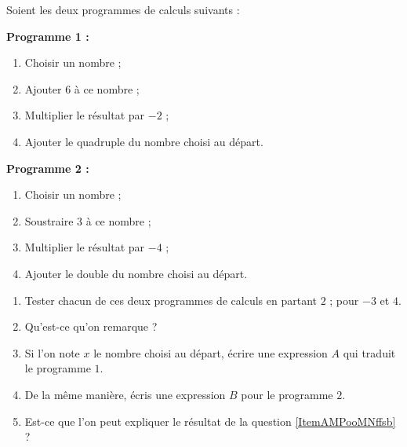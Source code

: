
\begin{exercice}\label{exosmath-0807}

Soient les deux programmes de calculs suivants :

\begin{framed}
    {\bf Programme 1 :}
\begin{enumerate}
    \item
 Choisir un nombre ;
\item
 Ajouter $6$ à ce nombre ;
\item
 Multiplier le résultat par $-2$ ;
\item
 Ajouter le quadruple du nombre choisi au départ.
\end{enumerate}
\end{framed}
\begin{framed}
    {\bf Programme 2 :}
\begin{enumerate}
    \item
 Choisir un nombre ;
    \item
 Soustraire $3$ à ce nombre ;
    \item
 Multiplier le résultat par $-4$ ;
    \item
 Ajouter le double du nombre choisi au départ.
\end{enumerate}
\end{framed}

\begin{enumerate}
    \item
 Tester chacun de ces deux programmes de calculs en partant $2$ ; pour $-3$ et $4$.
\item   \label{ItemAMPooMNffsb}
    Qu'est-ce qu'on remarque ?
\item
 Si l'on note $x$ le nombre choisi au départ, écrire une expression $A$ qui traduit le programme $1$.
\item
 De la même manière, écris une expression $B$ pour le programme $2$.
\item
    Est-ce que l'on peut expliquer le résultat de la question \ref{ItemAMPooMNffsb} ?
\end{enumerate}

\end{exercice}
